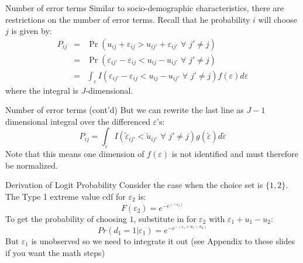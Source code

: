 \documentclass[english,aspectratio=169,12pt,xcolor=dvipsnames]{beamer}
\begin{document}
\begin{frame}{Number of error terms}
Similar to socio-demographic characteristics, there are restrictions on the number of error terms.
\bigskip
Recall that he probability $i$ will choose $j$ is given by:
\begin{eqnarray*}
P_{ij}&=&\Pr(u_{ij}+\varepsilon_{ij}>u_{ij'}+\varepsilon_{ij'}  \,\,\forall\,\,   j'\neq j)\\
&=&\Pr(\varepsilon_{ij'}-\varepsilon_{ij}<u_{ij}-u_{ij'}  \,\,\forall\,\,   j'\neq j)\\
&=&\int_{\varepsilon}I(\varepsilon_{ij'}-\varepsilon_{ij}<u_{ij}-u_{ij'}  \,\,\forall\,\,   j'\neq j)f(\varepsilon)d\varepsilon
\end{eqnarray*}
where the integral is $J$-dimensional.
\end{frame}



\begin{frame}{Number of error terms (cont'd)}
But we can rewrite the last line as $J-1$ dimensional integral over the differenced $\varepsilon$'s:
\begin{displaymath}
P_{ij}=\int_{\tilde{\varepsilon}}I(\tilde{\varepsilon}_{ij'}<\tilde{u}_{ij'}  \,\,\forall\,\,   j'\neq j)g(\tilde{\varepsilon})d\tilde{\varepsilon}
\end{displaymath}
Note that this means one dimension of $f(\varepsilon)$ is not identified and must therefore be normalized.
\end{frame}



\begin{frame}{Derivation of Logit Probability}
Consider the case when the choice set is $\{1,2\}$.  The Type 1 extreme value cdf for $\varepsilon_2$ is:
\begin{displaymath}
F(\varepsilon_2)=e^{-e^{(-\varepsilon_2)}}
\end{displaymath}
To get the probability of choosing $1$, substitute in for $\varepsilon_2$ with $\varepsilon_1+u_1-u_2$:
\begin{displaymath}
Pr(d_1=1|\varepsilon_1)=e^{-e^{-(\varepsilon_1+u_1-u_2)}}
\end{displaymath}
But $\varepsilon_1$ is unobserved so we need to integrate it out (see Appendix to these slides if you want the math steps)
\end{frame}
\end{document}
